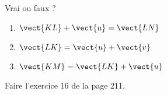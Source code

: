 
\begin{exercice}\label{exosmath-0595}

\begin{wrapfigure}{r}{3.5cm}
   \vspace{-1cm}        %
   \centering
   
\end{wrapfigure}

Vrai ou faux ?
\begin{enumerate}
    \item
        \( \vect{ KL }+\vect{ u }=\vect{ LN }\)
    \item
        \( \vect{ LK }=\vect{ u }+\vect{ v }\)
    \item
        \( \vect{ KM }=\vect{ LK }+\vect{ u }\)
\end{enumerate}

Faire l'exercice 16 de la page 211.

\end{exercice}
